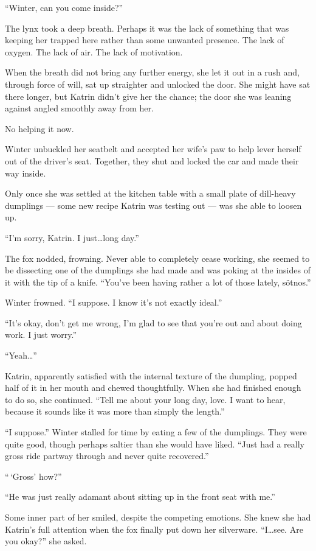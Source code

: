 ``Winter, can you come inside?''

The lynx took a deep breath. Perhaps it was the lack of something that was keeping her trapped here rather than some unwanted presence. The lack of oxygen. The lack of air. The lack of motivation.

When the breath did not bring any further energy, she let it out in a rush and, through force of will, sat up straighter and unlocked the door. She might have sat there longer, but Katrin didn't give her the chance; the door she was leaning against angled smoothly away from her.

No helping it now.

Winter unbuckled her seatbelt and accepted her wife's paw to help lever herself out of the driver's seat. Together, they shut and locked the car and made their way inside.

Only once she was settled at the kitchen table with a small plate of dill-heavy dumplings --- some new recipe Katrin was testing out --- was she able to loosen up.

``I'm sorry, Katrin. I just\ldots long day.''

The fox nodded, frowning. Never able to completely cease working, she seemed to be dissecting one of the dumplings she had made and was poking at the insides of it with the tip of a knife. ``You've been having rather a lot of those lately, sötnos.''

Winter frowned. ``I suppose. I know it's not exactly ideal.''

``It's okay, don't get me wrong, I'm glad to see that you're out and about doing work. I just worry.''

``Yeah\ldots{}''

Katrin, apparently satisfied with the internal texture of the dumpling, popped half of it in her mouth and chewed thoughtfully. When she had finished enough to do so, she continued. ``Tell me about your long day, love. I want to hear, because it sounds like it was more than simply the length.''

``I suppose.'' Winter stalled for time by eating a few of the dumplings. They were quite good, though perhaps saltier than she would have liked. ``Just had a really gross ride partway through and never quite recovered.''

``\,`Gross' how?''

``He was just really adamant about sitting up in the front seat with me.''

Some inner part of her smiled, despite the competing emotions. She knew she had Katrin's full attention when the fox finally put down her silverware. ``I\ldots see. Are you okay?'' she asked.

